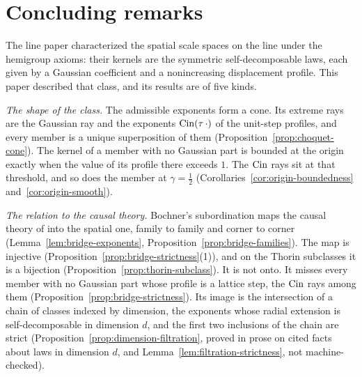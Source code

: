 
\section{Concluding remarks}\label{sec:conclusions}

The line paper  characterized the spatial scale spaces on the
line under the hemigroup axioms: their kernels are the symmetric self-decomposable laws, each given by a
Gaussian coefficient and a nonincreasing displacement profile. This paper described that
class, and its results are of five kinds.

\emph{The shape of the class.} The admissible exponents form a cone. Its extreme rays are the
Gaussian ray and the exponents $\operatorname{Cin}(\tau\,\cdot)$ of the unit-step profiles, and every member
is a unique superposition of them (Proposition~\ref{prop:choquet-cone}). The kernel of a
member with no Gaussian part is bounded at the origin exactly when the value of its profile
there exceeds $1$. The
$\operatorname{Cin}$ rays sit at that threshold, and so does the \Matern{} member at $\gamma = \tfrac12$
(Corollaries~\ref{cor:origin-boundedness} and~\ref{cor:origin-smooth}).

\emph{The relation to the causal theory.} Bochner's subordination maps the causal theory of
 into the spatial one, family to family and corner to corner
(Lemma~\ref{lem:bridge-exponents}, Proposition~\ref{prop:bridge-families}). The map is
injective (Proposition~\ref{prop:bridge-strictness}(1)), and on the Thorin subclasses it is a
bijection (Proposition~\ref{prop:thorin-subclass}). It is not onto. It misses every member
with no Gaussian part whose profile is a lattice step, the $\operatorname{Cin}$ rays among them
(Proposition~\ref{prop:bridge-strictness}). Its
image is the intersection of a chain of classes indexed by dimension, the exponents whose
radial extension is self-decomposable in dimension $d$, and the first two inclusions of the
chain are strict (Proposition~\ref{prop:dimension-filtration}, proved in prose on cited facts
about laws in dimension $d$, and Lemma~\ref{lem:filtration-strictness}, not machine-checked).

